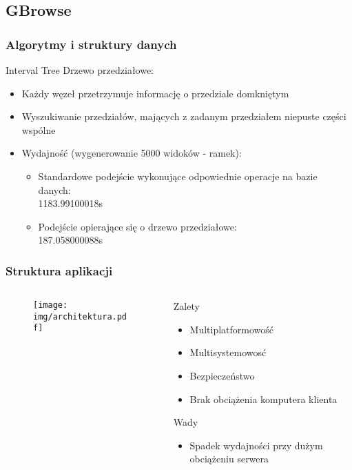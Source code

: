 \documentclass{beamer}
\begin{document}
\subsection{GBrowse}
\begin{frame}\frametitle{Algorytmy i struktury danych}
	\begin{block}{Interval Tree}
		Drzewo przedziałowe:
		\begin{itemize}
			\item Każdy węzeł przetrzymuje informację o przedziale domkniętym
			\item Wyszukiwanie przedziałów, mających z zadanym przedziałem niepuste części wspólne
			\item Wydajność (wygenerowanie 5000 widoków - ramek):
				\begin{itemize}
					\item Standardowe podejście wykonujące odpowiednie operacje na bazie danych: \\1183.99100018s
					\item Podejście opierające się o drzewo przedziałowe: \\187.058000088s
				\end{itemize}
		\end{itemize}
	\end{block}
\end{frame}


\begin{frame}\frametitle{Struktura aplikacji}
	\begin{columns}
		\begin{column}{6cm}
			\begin{figure}[htb]
				\begin{center}
	  				\texttt{[image: img/architektura.pdf]}
	  			\end{center}
			\end{figure}
    	\end{column}
    	\begin{column}{6cm}
    		\begin{block}{Zalety}
    			\begin{itemize}
    				\item Multiplatformowość
    				\item Multisystemowosć
    				\item Bezpieczeństwo
    				\item Brak obciążenia komputera klienta
    			\end{itemize}
    		\end{block}
    		\begin{block}{Wady}
    			\begin{itemize}
    				\item Spadek wydajności przy dużym obciążeniu serwera
    			\end{itemize}
    		\end{block}
		\end{column}
	\end{columns}	
\end{frame}
\end{document}
